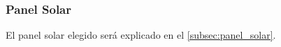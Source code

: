 \subsubsection{Panel Solar}

El panel solar elegido será explicado en el \autoref{subsec:panel_solar}.